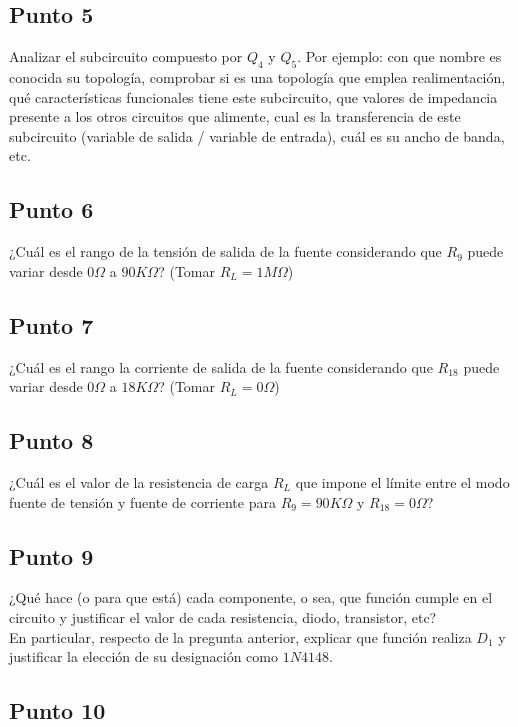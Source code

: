 \subsection{Punto 5}

Analizar el subcircuito compuesto por $Q_{4}$ y $Q_{5}$. Por ejemplo: con que nombre es conocida su topología, comprobar si es una topología que emplea realimentación, qué características funcionales tiene este subcircuito, que valores de impedancia presente a los otros circuitos que alimente, cual es la transferencia de este subcircuito (variable de salida / variable de entrada), cuál es su ancho de banda, etc.


\subsection{Punto 6}

¿Cuál es el rango de la tensión de salida de la fuente considerando que $R_{9}$ puede variar desde $0 \Omega$ a $90 K\Omega$? (Tomar $R_{L} = 1M\Omega$)


\subsection{Punto 7}

¿Cuál es el rango la corriente de salida de la fuente considerando que $R_{18}$ puede variar desde $0 \Omega$ a $18 K\Omega$? (Tomar $R_{L} = 0\Omega$)


\subsection{Punto 8}

¿Cuál es el valor de la resistencia de carga $R_{L}$ que impone el límite entre el modo fuente de tensión y fuente de corriente para $R_{9} = 90 K\Omega$ y $R_{18} = 0 \Omega$?


\subsection{Punto 9}

¿Qué hace (o para que está) cada componente, o sea, que función cumple en el circuito y justificar el valor de cada resistencia, diodo, transistor, etc?\\
En particular, respecto de la pregunta anterior, explicar que función realiza $D_{1}$ y justificar la elección de su designación como $1N4148$.


\subsection{Punto 10}

